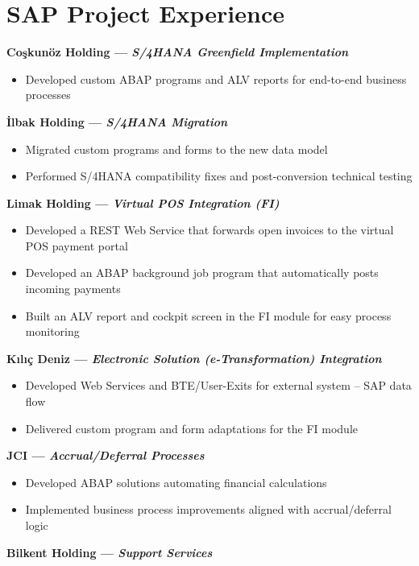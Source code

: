 \documentclass[10pt,a4paper]{extarticle}
\begin{document}
\section{SAP Project Experience}
\textbf{Coşkunöz Holding \textnormal{--- \textit{S/4HANA Greenfield Implementation}}}
\begin{itemize}[leftmargin=*,noitemsep,topsep=0pt]
    \item Developed custom ABAP programs and ALV reports for end-to-end business processes
\end{itemize}
\textbf{İlbak Holding \textnormal{--- \textit{S/4HANA Migration}}}
\begin{itemize}[leftmargin=*,noitemsep,topsep=0pt]
    \item Migrated custom programs and forms to the new data model
    \item Performed S/4HANA compatibility fixes and post-conversion technical testing
\end{itemize}
\textbf{Limak Holding \textnormal{--- \textit{Virtual POS Integration (FI)}}}
\begin{itemize}[leftmargin=*,noitemsep,topsep=0pt]
    \item Developed a REST Web Service that forwards open invoices to the virtual POS payment portal
    \item Developed an ABAP background job program that automatically posts incoming payments
    \item Built an ALV report and cockpit screen in the FI module for easy process monitoring
\end{itemize}
\textbf{Kılıç Deniz \textnormal{--- \textit{Electronic Solution (e-Transformation) Integration}}}
\begin{itemize}[leftmargin=*,noitemsep,topsep=0pt]
    \item Developed Web Services and BTE/User-Exits for external system -- SAP data flow
    \item Delivered custom program and form adaptations for the FI module
\end{itemize}
\textbf{JCI \textnormal{--- \textit{Accrual/Deferral Processes}}}
\begin{itemize}[leftmargin=*,noitemsep,topsep=0pt]
    \item Developed ABAP solutions automating financial calculations
    \item Implemented business process improvements aligned with accrual/deferral logic
\end{itemize}
\textbf{Bilkent Holding \textnormal{--- \textit{Support Services}}}
\end{document}
